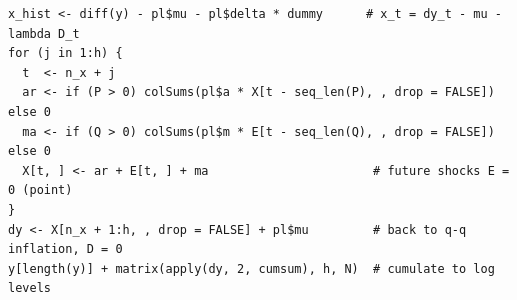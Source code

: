 \documentclass[11pt,a4paper]{article}
\begin{document}
\begin{lstlisting}
x_hist <- diff(y) - pl$mu - pl$delta * dummy      # x_t = dy_t - mu - lambda D_t
for (j in 1:h) {
  t  <- n_x + j
  ar <- if (P > 0) colSums(pl$a * X[t - seq_len(P), , drop = FALSE]) else 0
  ma <- if (Q > 0) colSums(pl$m * E[t - seq_len(Q), , drop = FALSE]) else 0
  X[t, ] <- ar + E[t, ] + ma                       # future shocks E = 0 (point)
}
dy <- X[n_x + 1:h, , drop = FALSE] + pl$mu         # back to q-q inflation, D = 0
y[length(y)] + matrix(apply(dy, 2, cumsum), h, N)  # cumulate to log levels
\end{lstlisting}
\end{document}
